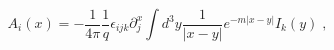 \begin{equation}
A_{i}(x)=-\frac{1}{4\pi }\frac{1}{q}\epsilon _{ijk}\partial _{j}^{x}\int
d^{3}y\frac{1}{\left| x-y\right| }e^{-m\left| x-y\right| }I_{k}(y)\;,
\label{ai}
\end{equation}

